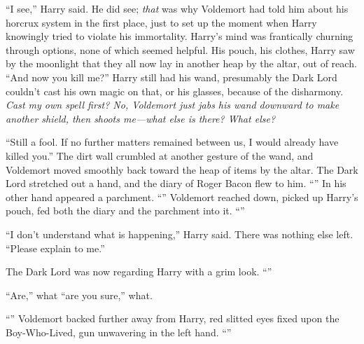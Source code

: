 “I see,” Harry said. He did see; \emph{that} was why Voldemort had told him about his horcrux system in the first place, just to set up the moment when Harry knowingly tried to violate his immortality. Harry’s mind was frantically churning through options, none of which seemed helpful. His pouch, his clothes, Harry saw by the moonlight that they all now lay in another heap by the altar, out of reach. “And now you kill me?” Harry still had his wand, presumably the Dark Lord couldn’t cast his own magic on that, or his glasses, because of the disharmony. \emph{Cast my own spell first? No, Voldemort just jabs his wand downward to make another shield, then shoots me—what else is there? \emph{What else?}}

“Still a fool. If no further matters remained between us, I would already have killed you.” The dirt wall crumbled at another gesture of the wand, and Voldemort moved smoothly back toward the heap of items by the altar. The Dark Lord stretched out a hand, and the diary of Roger Bacon flew to him. “” In his other hand appeared a parchment. “” Voldemort reached down, picked up Harry’s pouch, fed both the diary and the parchment into it. “”

“I don’t understand what is happening,” Harry said. There was nothing else left. “Please explain to me.”

The Dark Lord was now regarding Harry with a grim look. “”

“Are,” what “are you sure,” what.

“” Voldemort backed further away from Harry, red slitted eyes fixed upon the Boy-Who-Lived, gun unwavering in the left hand. “”

